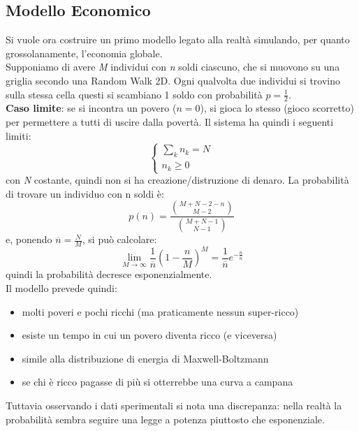 \documentclass[12pt, a4paper]{article}
\theoremstyle{theorem}
\begin{document}
		\subsection{Modello Economico}
			Si vuole ora costruire un primo modello legato alla realtà simulando, per quanto grossolanamente, l'economia globale.\\
			Supponiamo di avere \textit{M} individui con \textit{n} soldi ciascuno, che si muovono su una griglia secondo una Random Walk 2D.
			Ogni qualvolta due individui si trovino sulla stessa cella questi si scambiano 1 soldo con probabilità $p=\frac{1}{2}$.\\
			\textbf{Caso limite}: se si incontra un povero ($n=0$), si gioca lo stesso (gioco scorretto) per permettere a tutti di uscire dalla povertà.
			Il sistema ha quindi i seguenti limiti:
			\begin{equation}
				\begin{cases}
					\sum_kn_k=N\\
					n_k\geq 0
				\end{cases}
			\end{equation}
			con \textit{N} costante, quindi non si ha creazione/distruzione di denaro.
			La probabilità di trovare un individuo con n soldi è:
			\begin{equation}
				p(n)=\frac{\binom{M+N-2-n}{M-2}}{\binom{M+N-1}{N-1}}
			\end{equation}
			e, ponendo $\overline{n}=\frac{N}{M}$, si può calcolare:
			\begin{equation}
				\lim_{M\to\infty}\frac{1}{\overline{n}}\left( 1-\frac{n}{M}\right)^M=\frac{1}{\overline{n}}e^{-\frac{n}{\bar{n}}}
			\end{equation}
			quindi la probabilità decresce esponenzialmente.\\
			Il modello prevede quindi:
			\begin{itemize}
				\item molti poveri e pochi ricchi (ma praticamente nessun super-ricco)
				\item esiste un tempo in cui un povero diventa ricco (e viceversa)
				\item simile alla distribuzione di energia di Maxwell-Boltzmann
				\item se chi è ricco pagasse di più si otterrebbe una curva a campana
			\end{itemize}
			Tuttavia osservando i dati sperimentali si nota una discrepanza: nella realtà la probabilità sembra seguire una legge a potenza piuttosto che esponenziale.
\end{document}
